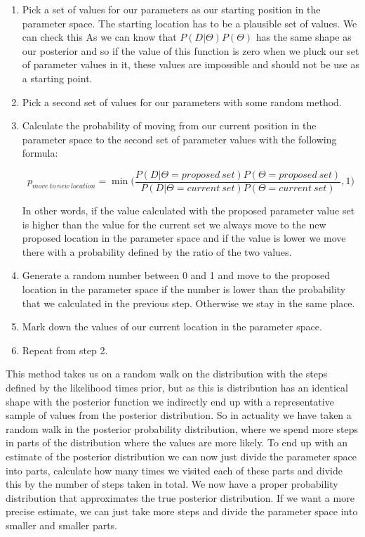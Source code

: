 \documentclass[12pt,a4paper,leqno]{report}
\theoremstyle{plain}
\theoremstyle{definition}
\theoremstyle{remark}
\begin{document}
\begin{enumerate}
    \item Pick a set of values for our parameters as our starting position in
          the parameter space. The starting location has to be a plausible set
          of values. We can check this As we can know that
          \(P(D|\Theta)P(\Theta)\) has the same shape as our posterior and so if
          the value of this function is zero when we pluck our set of
          parameter values in it, these values are impossible and should not be
          use as a starting point.
    \item Pick a second set of values for our parameters with some random method.
    \item Calculate the probability of moving from our current position in the
          parameter space to the second set of parameter values with the
          following formula:

          \begin{def}\label{randomwalk}
              \begin{equation}
                  p_{move\ to\ new\ location} = \min \bigg(\frac{P(D|\Theta = proposed\ set)P(\Theta = proposed\ set)}{P(D|\Theta = current\ set)P(\Theta = current\ set)}, 1 \bigg)
              \end{equation}
          \end{def}
          In other words, if the value calculated with the proposed parameter
          value set is higher than the value for the current set we always move
          to the new proposed location in the parameter space and if the value
          is lower we move there with a probability defined by the ratio of the
          two values.

    \item Generate a random number between 0 and 1 and move to the proposed
          location in the parameter space if the number is lower than the
          probability that we calculated in the previous step. Otherwise we stay
          in the same place.
    \item Mark down the values of our current location in the parameter space.
    \item Repeat from step 2.

\end{enumerate}

This method takes us on a random walk on the distribution with the steps defined
by the likelihood times prior, but as this is distribution has an identical shape
with the posterior function we indirectly end up with a representative sample of
values from the posterior distribution. So in actuality we have taken a random
walk in the posterior probability distribution, where we spend more steps in
parts of the distribution where the values are more likely. To end up with an
estimate of the posterior distribution we can now just divide the parameter
space into parts, calculate how many times we visited each of these parts and
divide this by the number of steps taken in total. We now have a proper probability
distribution that approximates the true posterior distribution. If we want a
more precise estimate, we can just take more steps and divide the parameter
space into smaller and smaller parts.
\end{document}
